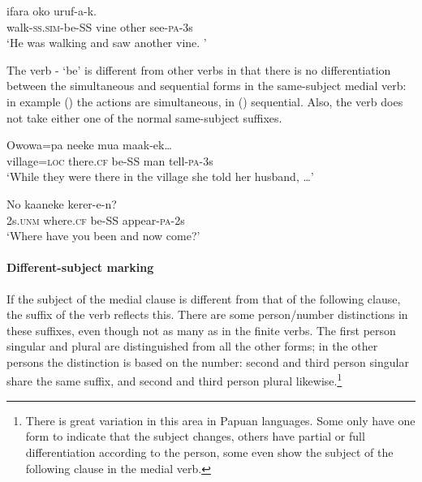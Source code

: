 \ea%
\label{ex:x241}
\gll {} ifara oko uruf-a-k. \\
walk-\textsc{ss}.\textsc{sim}-be-SS vine other see-\textsc{pa}-3s \\
\glt`He was walking and saw another vine. '
\z

The verb - `be' is different from other verbs in that there is no differentiation between the simultaneous and sequential forms in the same-subject medial verb: in example () the actions are simultaneous, in () sequential. Also, the verb does not take either one of the normal same-subject suffixes.

\ea%
\label{ex:x242}
\gll Owowa=pa neeke  mua maak-ek{\dots} \\
village=\textsc{loc} there.\textsc{cf} be-SS man tell-\textsc{pa}-3s \\
\glt`While they were there in the village she told her husband, {\dots}'
\z

\ea%
\label{ex:x243}
\gll No kaaneke  kerer-e-n? \\
2s.\textsc{unm} where.\textsc{cf} be-SS appear-\textsc{pa}-2s \\
\glt`Where have you been and now come?' 
\z

\paragraph[Different-subject marking]{Different-subject marking}
{}
If the subject of the medial clause is different from that of the following clause, the suffix of the  verb reflects this. There are some person/number distinctions in these suffixes, even though not as many as in the finite verbs. The first person singular and plural are distinguished from all the other forms; in the other persons the distinction is based on the number: second and third person singular share the same suffix, and second and third person plural likewise.\footnote{There is great variation in this area in Papuan languages. Some only have one form to indicate that the subject changes, others have partial or full differentiation according to the person, some even show the subject of the following clause in the medial verb.} 


